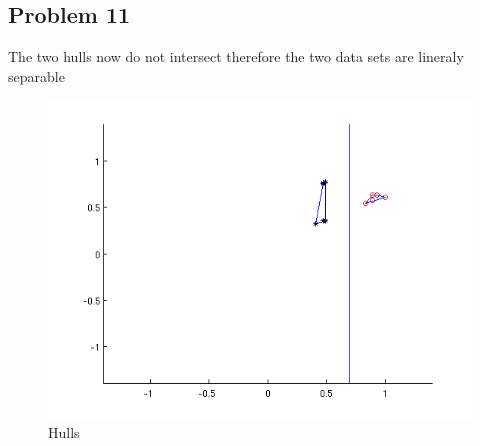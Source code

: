 \newpage
\subsection*{Problem 11}
The two hulls now do not intersect therefore the two data sets are lineraly
separable
\begin{figure}
\centering{}\includegraphics[width=1\textwidth]{plots/10_hull_2}\caption{Hulls}
\end{figure}

\newpage
